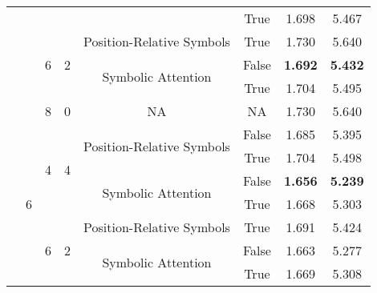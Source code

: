\begin{tabular}{@{}|c|c|c|c|c|c|c|c|@{}}
                        &                    &                    &                    &                                            & True         & 1.698          & 5.467          \\ \cline{3-8} 
                        &                    & \multirow{3}{*}{6} & \multirow{3}{*}{2} & Position-Relative Symbols                  & True         & 1.730          & 5.640          \\ \cline{5-8} 
                        &                    &                    &                    & \multirow{2}{*}{Symbolic Attention}        & False        & \textbf{1.692} & \textbf{5.432} \\
                        &                    &                    &                    &                                            & True         & 1.704          & 5.495          \\ \cline{3-8} 
                        &                    & 8                  & 0                  & NA                                         & NA           & 1.730          & 5.640          \\ \cline{2-8} 
                        & \multirow{8}{*}{6} & \multirow{4}{*}{4} & \multirow{4}{*}{4} & \multirow{2}{*}{Position-Relative Symbols} & False        & 1.685          & 5.395          \\
                        &                    &                    &                    &                                            & True         & 1.704          & 5.498          \\ \cline{5-8} 
                        &                    &                    &                    & \multirow{2}{*}{Symbolic Attention}        & False        & \textbf{1.656} & \textbf{5.239} \\
                        &                    &                    &                    &                                            & True         & 1.668          & 5.303          \\ \cline{3-8} 
                        &                    & \multirow{3}{*}{6} & \multirow{3}{*}{2} & Position-Relative Symbols                  & True         & 1.691          & 5.424          \\ \cline{5-8} 
                        &                    &                    &                    & \multirow{2}{*}{Symbolic Attention}        & False        & 1.663          & 5.277          \\
                        &                    &                    &                    &                                            & True         & 1.669          & 5.308          \\ \cline{3-8} 

\end{tabular}

